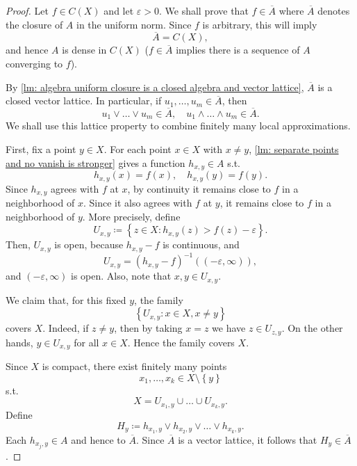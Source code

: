 \begin{proof}
    Let \(f \in C(X)\) and let \(\varepsilon > 0\). We shall prove that \(f \in \overline{A} \) where \(\overline{A} \) denotes the closure of \(A\) in the uniform norm. Since \(f\) is arbitrary, this will imply 
    \[
        \overline{A} = C(X),
    \]      
    and hence \(A\) is dense in \(C(X)\) (\(f \in \overline{A}\) implies there is a sequence of \(A\) converging to \(f\)).

    By \autoref{lm: algebra uniform closure is a closed algebra and vector lattice}, \(\overline{A} \) is a closed vector lattice. In particular, if \(u_1, \dots , u_m \in \overline{A}\), then 
    \[
        u_1 \lor \dots \lor u_m \in \overline{A}, \quad u_1 \land \dots \land u_m \in \overline{A}.
    \]    
    We shall use this lattice property to combine finitely many local approximations. 

    First, fix a point \(y \in X\). For each point \(x \in X\) with \(x \neq y\), \autoref{lm: separate points and no vanish is stronger} gives a function \(h_{x, y} \in A\) s.t. 
    \[
        h_{x, y}(x) = f(x), \quad h_{x, y}(y) = f(y).
    \]     
    Since \(h_{x, y}\) agrees with \(f\) at \(x\), by continuity it remains close to \(f\) in a neighborhood of \(x\). Since it also agrees with \(f\) at \(y\), it remains close to \(f\) in a neighborhood of \(y\). More precisely, define 
    \[
        U_{x, y} \coloneqq \left\{ z \in X: h_{x, y}(z) > f(z) - \varepsilon \right\}. 
    \]         
    Then, \(U_{x, y}\) is open, because \(h_{x, y} - f\) is continuous, and 
    \[
        U_{x, y} = (h_{x, y} - f)^{-1} ((-\varepsilon, \infty)),
    \]  
    and \((-\varepsilon, \infty)\) is open. Also, note that \(x, y \in U_{x, y}\). 

    We claim that, for this fixed \(y\), the family 
    \[
        \left\{ U_{x, y} : x \in X, x \neq y \right\} 
    \]   
    covers \(X\). Indeed, if \(z \neq y\), then by taking \(x = z\) we have \(z \in U_{z, y}\). On the other hands, \(y \in U_{x, y}\) for all \(x \in X\). Hence the family covers \(X\). 

    Since \(X\) is compact, there exist finitely many points 
    \[
        x_1, \dots , x_k \in X \setminus \left\{ y \right\} 
    \]        
    s.t. 
    \[
        X = U_{x_1, y} \cup \dots \cup U_{x_k, y}.
    \]
    Define 
    \[
        H_y \coloneqq h_{x_1, y} \lor h_{x_2, y} \lor \dots \lor h_{x_k, y}.
    \]
    Each \(h_{x_j, y} \in A\) and hence to \(\overline{A}\). Since \(\overline{A}\) is a vector lattice, it follows that \(H_y \in \overline{A}\). 


\end{proof}
